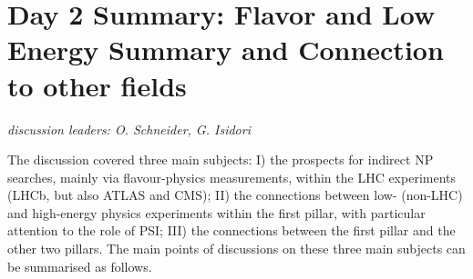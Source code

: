 \section{Day 2 Summary: Flavor and Low Energy Summary and Connection to other 
fields}\label{discussionconnetion}{\it discussion leaders: O. Schneider, G. Isidori}

\noindent The discussion covered three main subjects: I) the prospects for indirect NP searches, mainly via flavour-physics 
measurements, within the LHC experiments (LHCb, but also ATLAS and CMS);
II) the connections between low- (non-LHC) and high-energy physics experiments within the first pillar, with particular attention to the role of PSI;
III) the connections between the first pillar and the other two pillars.
The main points of discussions on these three main subjects can be summarised as follows.

